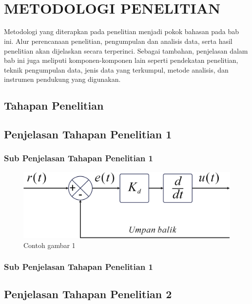 \chapter[METODOLOGI PENELITIAN]{\\ METODOLOGI PENELITIAN}
Metodologi yang diterapkan pada penelitian menjadi pokok bahasan pada bab ini. Alur perencanaan penelitian, pengumpulan dan analisis data, serta hasil penelitian akan dijelaskan secara terperinci. Sebagai tambahan, penjelasan dalam bab ini juga meliputi komponen-komponen lain seperti pendekatan penelitian, teknik pengumpulan data, jenis data yang terkumpul, metode analisis, dan instrumen pendukung yang digunakan.

\section{Tahapan Penelitian}
\lipsum[1]

\section{Penjelasan Tahapan Penelitian 1}
\lipsum[1]

\subsection{Sub Penjelasan Tahapan Penelitian 1}
\lipsum[1]

\begin{figure}[H]
    \centering
    \includegraphics[width=0.8\linewidth]{gambar/diagram.png}
    \caption{Contoh gambar 1}
    \label{gambar1}
\end{figure}

\lipsum[1]

\subsection{Sub Penjelasan Tahapan Penelitian 1}
\lipsum[1]

\section{Penjelasan Tahapan Penelitian 2}
\lipsum[1]

